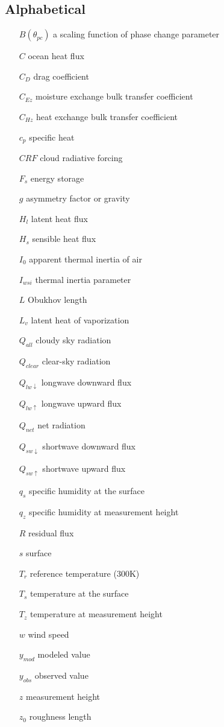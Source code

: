 \subsection{Alphabetical}
\begin{enumerate}
    \item[$B(\theta_{pc})$] a scaling function of phase change parameter
    \item[$C$] ocean heat flux
    \item[$C_{D}$] drag coefficient
    \item[$C_{Ez}$] moisture exchange bulk transfer coefficient
    \item[$C_{Hz}$] heat exchange bulk transfer coefficient
    \item[$c_{p}$] specific heat
    \item[$CRF$] cloud radiative forcing
    \item[$F_{s}$] energy storage
    \item[$g$] asymmetry factor or gravity
    \item[$H_{l}$] latent heat flux
    \item[$H_{s}$] sensible heat flux
    \item[$I_{0}$] apparent thermal inertia of air 
    \item[$I_{wsi}$] thermal inertia parameter
    \item[$L$] Obukhov length
    \item[$L_{v}$] latent heat of vaporization
    \item[$Q_{all}$] cloudy sky radiation
    \item[$Q_{clear}$] clear-sky radiation
    \item[$Q_{lw \downarrow}$] longwave downward flux
    \item[$Q_{lw \uparrow}$] longwave upward flux
    \item[$Q_{net}$] net radiation
    \item[$Q_{sw \downarrow}$] shortwave downward flux
    \item[$Q_{sw \uparrow}$] shortwave upward flux
    \item[$q_{s}$] specific humidity at the surface
    \item[$q_{z}$] specific humidity at measurement height
    \item[$R$] residual flux
    \item[$s$] surface
    \item[$T_{r}$] reference temperature (300K)
    \item[$T_{s}$] temperature at the surface
    \item[$T_{z}$] temperature at measurement height
    \item[$w$] wind speed
    \item[$y_{mod}$] modeled value
    \item[$y_{obs}$] observed value
    \item[$z$] measurement height
    \item[$z_{0}$] roughness length
\end{enumerate}
